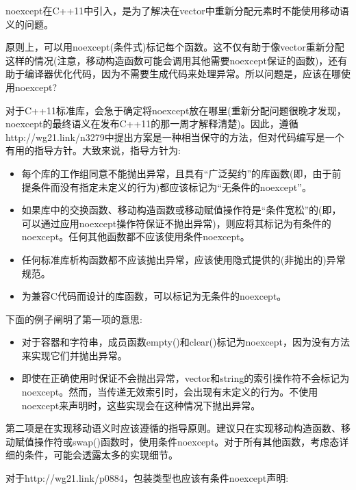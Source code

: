 noexcept在C++11中引入，是为了解决在vector中重新分配元素时不能使用移动语义的问题。\par

原则上，可以用noexcept(条件式)标记每个函数。这不仅有助于像vector重新分配这样的情况(注意，移动构造函数可能会调用其他需要noexcept保证的函数)，还有助于编译器优化代码，因为不需要生成代码来处理异常。所以问题是，应该在哪使用noexcept?\par

对于C++11标准库，会急于确定将noexcept放在哪里(重新分配问题很晚才发现，noexcept的最终语义在发布C++11的那一周才解释清楚)。因此，遵循http://wg21.link/n3279中提出方案是一种相当保守的方法，但对代码编写是一个有用的指导方针。大致来说，指导方针为:\par

\begin{itemize}
	\item 每个库的工作组同意不能抛出异常，且具有“广泛契约”的库函数(即，由于前提条件而没有指定未定义的行为)都应该标记为“无条件的noexcept”。
	\item 如果库中的交换函数、移动构造函数或移动赋值操作符是“条件宽松”的(即，可以通过应用noexcept操作符保证不抛出异常)，则应将其标记为有条件的noexcept。任何其他函数都不应该使用条件noexcept。
	\item 任何标准库析构函数都不应该抛出异常，应该使用隐式提供的(非抛出的)异常规范。
	\item 为兼容C代码而设计的库函数，可以标记为无条件的noexcept。
\end{itemize}

下面的例子阐明了第一项的意思:\par

\begin{itemize}
	\item 对于容器和字符串，成员函数empty()和clear()标记为noexcept，因为没有方法来实现它们并抛出异常。
	\item 即使在正确使用时保证不会抛出异常，vector和string的索引操作符不会标记为noexcept。然而，当传递无效索引时，会出现有未定义的行为。不使用noexcept来声明时，这些实现会在这种情况下抛出异常。
\end{itemize}

第二项是在实现移动语义时应该遵循的指导原则。建议只在实现移动构造函数、移动赋值操作符或swap()函数时，使用条件noexcept。对于所有其他函数，考虑态详细的条件，可能会透露太多的实现细节。\par

对于http://wg21.link/p0884，包装类型也应该有条件noexcept声明:\par

